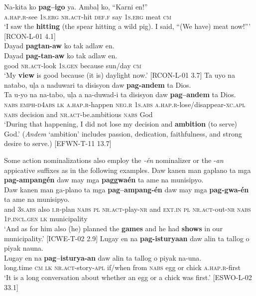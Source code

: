  \gll Na-kita  ko  \textbf{pag--igo}  ya.  Ambaļ  ko,  “Karni  en!” \\
\textsc{a.hap.r}-see  1\textsc{s.erg}  \textsc{nr.act}-hit  \textsc{def.f}  say  1\textsc{s.erg}  meat  \textsc{cm} \\
\glt ‘I saw the \textbf{hitting} (the spear hitting a wild pig). I said, “(We have) meat now!”' [RCON-L-01 4.1] \\
\z
\ea
Dayad  \textbf{pagtan-aw}  ko  tak  adlaw  en. \\\smallskip
 \gll Dayad  \textbf{pag-tan-aw}  ko  tak  adlaw  en. \\
good  \textsc{nr.act}-look  1\textsc{s.gen}  because  sun/day  \textsc{cm} \\
\glt ‘My \textbf{view} is good because (it is) daylight now.’ [RCON-L-01 3.7]
\z
\ea
Ta  uyo  na  natabo,  uļa  a naduwari  ta  disisyon  daw  \textbf{pag-andem} ta  Dios. \\\smallskip
 \gll Ta  u-yo  na  na-tabo,  uļa  a na-duwad-i  ta  disisyon  daw  \textbf{pag--andem} ta  Dios. \\
\textsc{nabs}  \textsc{emph}-\textsc{d}4\textsc{abs}  \textsc{lk}  \textsc{a.hap.r}-happen  \textsc{neg.r}  1\textsc{s.abs} \textsc{a.hap.r}-lose/disappear-\textsc{xc.apl} \textsc{nabs} decision  and  \textsc{nr.act}-be.ambitious \textsc{nabs}  God \\
\glt `During that happening, I did not lose my decision and \textbf{ambition} (to serve) God.’ (\textit{Andem} ‘ambition’ includes passion, dedication, faithfulness, and strong desire to serve.) [EFWN-T-11 13.7]
\z

Some action nominalizations also employ the \textit{-én} nominalizer or the -\textit{an} appicative suffixes as in the following examples.
\ea
Daw  kanen  man  gaplano  ta  mga  \textbf{pag-ampangén}  daw  may mga  \textbf{paggwaén}  ta  ame  na  munisipyo. \\\smallskip
 \gll Daw  kanen  man  ga-plano  ta  mga  \textbf{pag--ampang-én}  daw  may mga  \textbf{pag-gwa-én}  ta  ame  na  munisipyo. \\
and  3\textsc{s.abs}  also  \textsc{i.r}-plan  \textsc{nabs}  \textsc{pl}  \textsc{nr.act}-play-\textsc{nr} and \textsc{ext.in} \textsc{pl}  \textsc{nr.act}-out-\textsc{nr}  \textsc{nabs}  1\textsc{p.incl.gen}  \textsc{lk}  municipality \\
\glt ‘And as for him also (he) planned the \textbf{games} and he had \textbf{shows} in our municipality.' [ICWE-T-02 2.9]
\z
\ea
Lugay  en  na  \textbf{pag-isturyaan}  daw  alin  ta  tallog  o  piyak  nauna. \\\smallskip
 \gll Lugay  en  na  \textbf{pag--isturya-an}  daw  alin  ta  tallog  o  piyak  na-una. \\
long.time  \textsc{cm}  \textsc{lk}  \textsc{nr.act}-story-\textsc{apl}  if/when  from  \textsc{nabs}  egg  or  chick  \textsc{a.hap.r}-first \\
\glt ‘It is a long conversation about whether an egg or a chick was first.’ [ESWO-L-02 33.1]
\z

